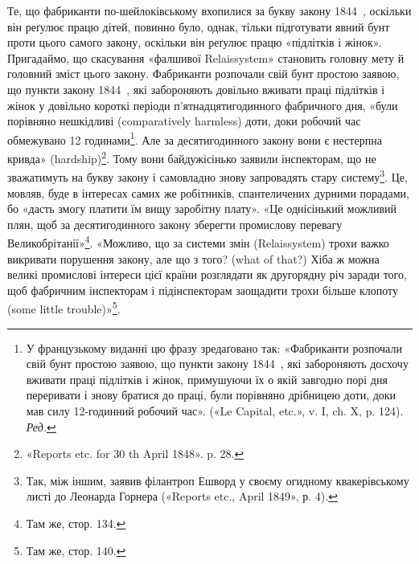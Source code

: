 \noindent{}Те, що фабриканти по-шейлоківському вхопилися за букву
закону 1844~, оскільки він реґулює працю дітей, повинно було,
однак, тільки підготувати явний бунт проти цього самого закону,
оскільки він реґулює працю «підлітків і жінок». Пригадаймо, що
скасування «фалшивої Relaissystem» становить головну мету
й головний зміст цього закону. Фабриканти розпочали свій бунт
простою заявою, що пункти закону 1844~, які забороняють довільно
вживати праці підлітків і жінок у довільно короткі
періоди п’ятнадцятигодинного фабричного дня, «були порівняно
нешкідливі (comparatively harmless) доти, доки робочий час
обмежувано 12 годинами\footnote*{
У французькому виданні цю фразу зредаґовано так: «Фабриканти
розпочали свій бунт простою заявою, що пункти закону 1844~, які забороняють
досхочу вживати праці підлітків і жінок, примушуючи їх о якій
завгодно порі дня переривати і знову братися до праці, були порівняно
дрібницею доти, доки мав силу 12-годинний робочий час». («Le Capital,
etc.», v. I, ch. X, p. 124). \emph{Ред.}
}. Але за десятигодинного закону вони
є нестерпна кривда» (hardship)\footnote{
«Reports etc. for 30 th April 1848». p. 28.
}. Тому вони байдужісінько
заявили інспекторам, що не зважатимуть на букву закону і
самовладно знову запровадять стару систему\footnote{
Так, між іншим, заявив філантроп Ешворд у своєму огидному
квакерівському листі до Леонарда Горнера («Reports etc., April 1849»,
р. 4).
}. Це, мовляв,
буде в інтересах самих же робітників, спантеличених дурними
порадами, бо «дасть змогу платити їм вищу заробітну плату».
«Це однісінький можливий плян, щоб за десятигодинного закону
зберегти промислову перевагу Великобрітанії»\footnote{
Там же, стор. 134.
}. «Можливо,
що за системи змін (Relaissystem) трохи важко викривати порушення
закону, але що з того? (what of that?) Хіба ж можна
великі промислові інтереси цієї країни розглядати як другорядну
річ заради того, щоб фабричним інспекторам і підінспекторам
заощадити трохи більше клопоту (some little trouble)»\footnote{
Там же, стор. 140.
}.
